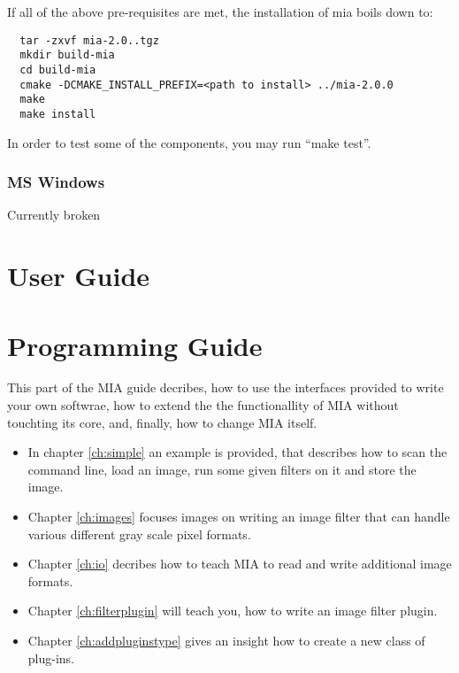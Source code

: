 \documentclass[english, 10pt, a4paper,headsepline,openany]{scrbook}
\begin{document}
If all of the above pre-requisites are met, the installation of mia boils down to:

\lstset{language=bash}
\begin{lstlisting}
  tar -zxvf mia-2.0..tgz
  mkdir build-mia
  cd build-mia
  cmake -DCMAKE_INSTALL_PREFIX=<path to install> ../mia-2.0.0
  make
  make install
\end{lstlisting}
In order to test some of the components, you may run ``make test''. 

\subsection{MS Windows} 

Currently broken 

\chapter{User Guide}






\chapter{Programming Guide}
\lstset{numbers=left, numberstyle=\small, numbersep=5pt}

This part of the MIA guide decribes, how to use the interfaces provided to write your own softwrae, 
  how to extend the the functionallity of MIA without touchting its core, and, finally, how to 
  change MIA itself. 
\begin{itemize}
\item In chapter \ref{ch:simple} an example is provided, that describes how to scan the command line, load an image, 
  run some given filters on it and store the image. 
\item Chapter \ref{ch:images} focuses images on writing an image filter that can handle various different gray scale pixel formats.
\item Chapter \ref{ch:io} decribes how to teach MIA to read and write additional image formats. 
\item Chapter \ref{ch:filterplugin} will teach you, how to write an image filter plugin. 
\item Chapter \ref{ch:addpluginstype} gives an insight how to create a new class of plug-ins.
\end{itemize}
\end{document}
